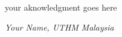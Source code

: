 \begin{acknowledgement}

your aknowledgment goes here

\begin{flushright}
\textit{Your Name, UTHM Malaysia}
\end{flushright}
\end{acknowledgement}
